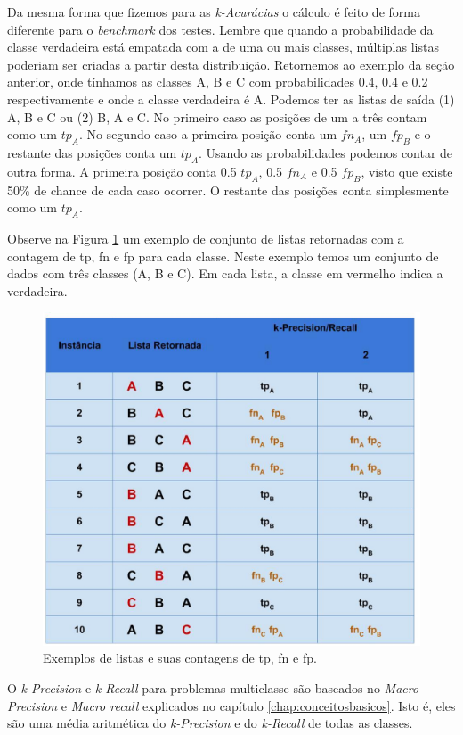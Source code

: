 Da mesma forma que fizemos para as \textit{k-Acurácias} o cálculo é feito de forma diferente para o \textit{benchmark} dos testes.
Lembre que quando a probabilidade da classe verdadeira está empatada com a de uma ou mais classes, múltiplas listas poderiam ser criadas a partir desta distribuição.
Retornemos ao exemplo da seção anterior, onde tínhamos as classes A, B e C com probabilidades 0.4, 0.4 e 0.2 respectivamente e onde a classe verdadeira é A.
Podemos ter as listas de saída (1) A, B e C ou (2) B, A e C.
No primeiro caso as posições de um a três contam como um $tp_A$.
No segundo caso a primeira posição conta um $fn_A$, um $fp_B$ e o restante das posições conta um $tp_A$.
Usando as probabilidades podemos contar de outra forma.
A primeira posição conta 0.5 $tp_A$, 0.5 $fn_A$ e 0.5 $fp_B$, visto que existe 50\% de chance de cada caso ocorrer.
O restante das posições conta simplesmente como um $tp_A$.

Observe na Figura \ref{fig:descricaodostestes03} um exemplo de conjunto de listas retornadas com a contagem de tp, fn e fp para cada classe.
Neste exemplo temos um conjunto de dados com três classes (A, B e C).
Em cada lista, a classe em vermelho indica a verdadeira.

\begin{figure}[h!]
  \centering
  \includegraphics[width=120mm,scale=0.8]{images/descricaodostestes03.eps}
  \caption{Exemplos de listas e suas contagens de tp, fn e fp.}
  \label{fig:descricaodostestes03}
\end{figure}

O \textit{k-Precision} e \textit{k-Recall} para problemas multiclasse são baseados no \textit{Macro Precision} e \textit{Macro recall} explicados no capítulo \ref{chap:conceitosbasicos}.
Isto é, eles são uma média aritmética do \textit{k-Precision} e do \textit{k-Recall} de todas as classes. 

